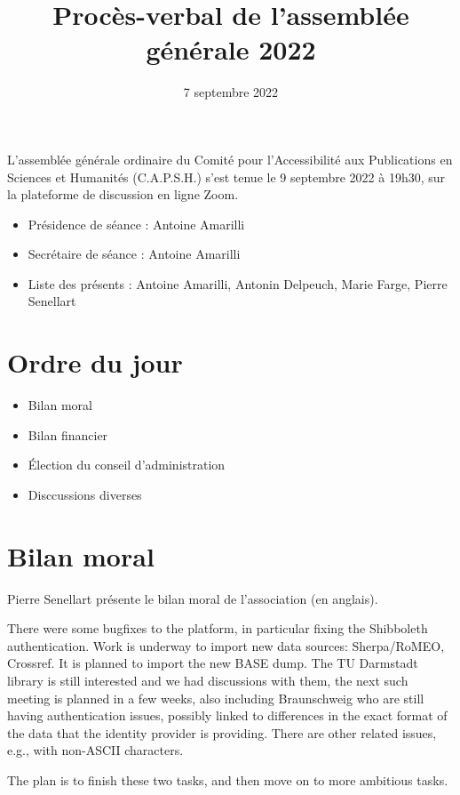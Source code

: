 \documentclass[a4paper]{article}
\title{Procès-verbal de l'assemblée générale 2022}
\date{7 septembre 2022}
\begin{document}
\maketitle

L'assemblée générale ordinaire du Comité pour l'Accessibilité aux Publications
en Sciences et Humanités (C.A.P.S.H.) s'est tenue le 9 septembre 2022 à 19h30,
sur la plateforme de discussion en ligne Zoom.

\begin{itemize}
  \item Présidence de séance : Antoine Amarilli
  \item Secrétaire de séance : Antoine Amarilli
  \item Liste des présents : Antoine Amarilli, Antonin Delpeuch, Marie Farge, Pierre Senellart
\end{itemize}

\section{Ordre du jour}

\begin{itemize}
\item Bilan moral
\item Bilan financier
\item Élection du conseil d'administration
\item Disccussions diverses
\end{itemize}

\section{Bilan moral}

Pierre Senellart présente le bilan moral de l'association (en anglais).

There were some bugfixes to the platform, in particular fixing the Shibboleth authentication. Work is underway to import new data sources: Sherpa/RoMEO, Crossref. It is planned to import the new BASE dump. The TU Darmstadt library is still interested and we had discussions with them, the next such meeting is planned in a few weeks, also including Braunschweig who are still having authentication issues, possibly linked to differences in the exact format of the data that the identity provider is providing. There are other related issues, e.g., with non-ASCII characters.

The plan is to finish these two tasks, and then move on to more ambitious tasks.
\end{document}
